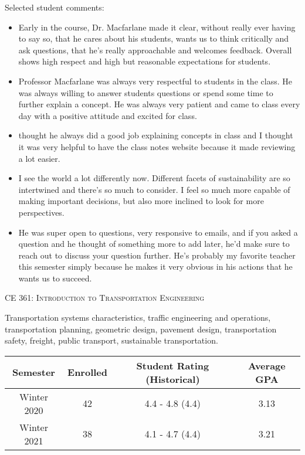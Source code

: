 \documentclass[margin,line]{res}
\newif\ifdetail
\newcommand{\acc}{\scshape }
\begin{document}
\begin{resume}
Selected student comments:
\begin{itemize}
  \item Early in the course, Dr. Macfarlane made it clear, without really ever
    having to say so, that he cares about his students, wants us to think
    critically and ask questions, that he's really approachable and welcomes
    feedback. Overall shows high respect and high but reasonable expectations
    for students.
  \item Professor Macfarlane was always very respectful to students in the class. He
    was always willing to answer students questions or spend some time to
    further explain a concept. He was always very patient and came to class
    every day with a positive attitude and excited for class.
  \item thought he always did a good job explaining concepts in class and I thought it was very helpful to have the class notes website because it made reviewing a lot easier.
  \item I see the world a lot differently now. Different facets of sustainability are so intertwined and there's so much to consider. I feel so much more capable of making important decisions, but also more inclined to look for more perspectives.
  \item He was super open to questions, very responsive to emails, and if you asked a question and he thought of something more to add later, he'd make sure to reach out to discuss your question further. He's probably my favorite teacher this semester simply because he makes it very obvious in his actions that he wants us to succeed.
\end{itemize}


\fi

\vspace{.4cm}
{\acc CE 361: Introduction to Transportation Engineering}

\vspace{-.4cm}
Transportation systems characteristics, traffic engineering and operations,
transportation planning, geometric design, pavement design, transportation
safety, freight, public transport, sustainable transportation.

\ifdetail
\begin{tabular}{cccc}
  \toprule
  Semester & Enrolled & Student Rating (Historical) & Average GPA\\
  \midrule
  Winter 2020 & 42 & 4.4 - 4.8 (4.4) & 3.13 \\
  Winter 2021 & 38 & 4.1 - 4.7 (4.4) & 3.21 \\
  \bottomrule


\end{tabular}
\end{resume}
\end{document}
